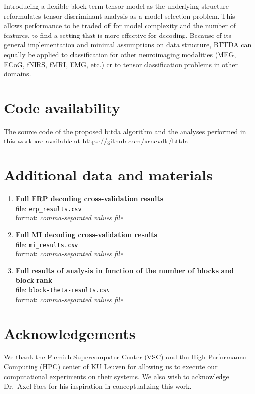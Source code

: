 \documentclass[twocolumn]{article}
\begin{document}
Introducing a flexible block-term tensor model as the underlying structure
reformulates tensor discriminant analysis as a model selection
problem.
This allows performance to be traded off for model complexity and the number of
features, to find a setting that is more effective for decoding.
Because of its general implementation and minimal assumptions on data structure,
BTTDA can equally be applied to classification for other neuroimaging modalities
(MEG, ECoG, fNIRS, fMRI, EMG, etc.) or to tensor classification problems in other
domains.

\section*{Code availability}

The source code of the proposed \ac{bttda} algorithm and the analyses performed in
this work are available at \url{https://github.com/arnevdk/bttda}.

\section*{Additional data and materials}
\begin{enumerate}
	\item\textbf{Full ERP decoding cross-validation results} \\
	file: \texttt{erp\_results.csv}\\
	format: \textit{comma-separated values file}
	\label{item:add/erp-results}
	\item\textbf{Full MI decoding cross-validation results} \\
	file: \texttt{mi\_results.csv}\\
	format: \textit{comma-separated values file}
	\label{item:add/mi-results}
	\item\textbf{Full results of analysis in function of the number of blocks and block rank}\\
	file: \texttt{block-theta-results.csv}\\
	format: \textit{comma-separated values file}
	\label{item:add/blocks}

\end{enumerate}

\section*{Acknowledgements}
We thank the Flemish Supercomputer Center (VSC) and the High-Performance
Computing (HPC) center of KU Leuven for allowing us to execute our
computational experiments on their systems.
We also wish to acknowledge Dr.\ Axel Faes for his inspiration in
conceptualizing this work.
\end{document}
